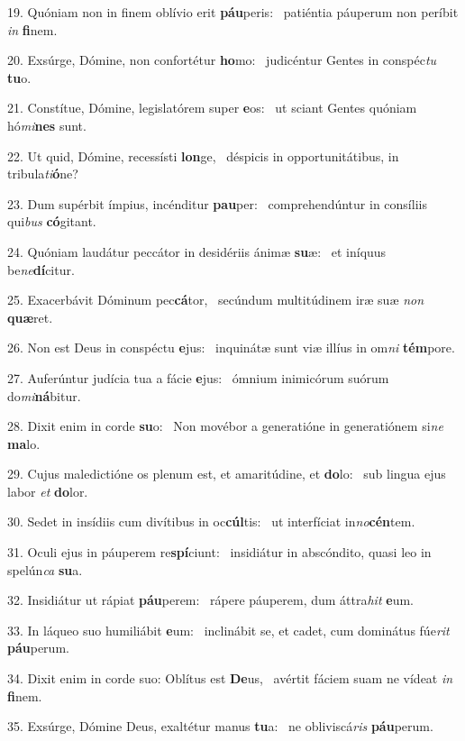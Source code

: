 19. Quóniam non in finem oblívio erit \textbf{páu}peris: \ast\  patiéntia páuperum non períbit \textit{in} \textbf{fi}nem.\

20. Exsúrge, Dómine, non confortétur \textbf{ho}mo: \ast\  judicéntur Gentes in conspéc\textit{tu} \textbf{tu}o.\

21. Constítue, Dómine, legislatórem super \textbf{e}os: \ast\  ut sciant Gentes quóniam hó\textit{mi}\textbf{nes} sunt.\

22. Ut quid, Dómine, recessísti \textbf{lon}ge, \ast\  déspicis in opportunitátibus, in tribula\textit{ti}\textbf{ó}ne?\

23. Dum supérbit ímpius, incénditur \textbf{pau}per: \ast\  comprehendúntur in consíliis qui\textit{bus} \textbf{có}gitant.\

24. Quóniam laudátur peccátor in desidériis ánimæ \textbf{su}æ: \ast\  et iníquus be\textit{ne}\textbf{dí}citur.\

25. Exacerbávit Dóminum pec\textbf{cá}tor, \ast\  secúndum multitúdinem iræ suæ \textit{non} \textbf{quæ}ret.\

26. Non est Deus in conspéctu \textbf{e}jus: \ast\  inquinátæ sunt viæ illíus in om\textit{ni} \textbf{tém}pore.\

27. Auferúntur judícia tua a fácie \textbf{e}jus: \ast\  ómnium inimicórum suórum do\textit{mi}\textbf{ná}bitur.\

28. Dixit enim in corde \textbf{su}o: \ast\  Non movébor a generatióne in generatiónem si\textit{ne} \textbf{ma}lo.\

29. Cujus maledictióne os plenum est, et amaritúdine, et \textbf{do}lo: \ast\  sub lingua ejus labor \textit{et} \textbf{do}lor.\

30. Sedet in insídiis cum divítibus in oc\textbf{cúl}tis: \ast\  ut interfíciat in\textit{no}\textbf{cén}tem.\

31. Oculi ejus in páuperem re\textbf{spí}ciunt: \ast\  insidiátur in abscóndito, quasi leo in spelún\textit{ca} \textbf{su}a.\

32. Insidiátur ut rápiat \textbf{páu}perem: \ast\  rápere páuperem, dum áttra\textit{hit} \textbf{e}um.\

33. In láqueo suo humiliábit \textbf{e}um: \ast\  inclinábit se, et cadet, cum dominátus fúe\textit{rit} \textbf{páu}perum.\

34. Dixit enim in corde suo: Oblítus est \textbf{De}us, \ast\  avértit fáciem suam ne vídeat \textit{in} \textbf{fi}nem.\

35. Exsúrge, Dómine Deus, exaltétur manus \textbf{tu}a: \ast\  ne obliviscá\textit{ris} \textbf{páu}perum.\

